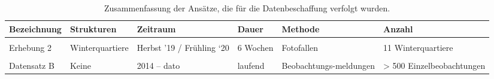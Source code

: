 \documentclass[
  oneside]{scrbook}
\begin{document}
\begin{table}

\caption{\label{tab:erhebungswochen}Zusammenfassung der Ansätze, die für die Datenbeschaffung verfolgt wurden.}
\centering
\begin{tabular}[t]{llp{20mm}lp{22mm}p{40mm}}
\toprule
Bezeichnung & Strukturen & Zeitraum & Dauer & Methode & Anzahl\\
\midrule
\cellcolor{gray!6}{Erhebung 1} & \cellcolor{gray!6}{Asthaufen} & \cellcolor{gray!6}{Herbst ’19 / Frühling ‘20} & \cellcolor{gray!6}{6 Wochen} & \cellcolor{gray!6}{Spurentunnel} & \cellcolor{gray!6}{39 Asthaufen}\\
Erhebung 2 & Winterquartiere & Herbst ’19 / Frühling ‘20 & 6 Wochen & Fotofallen & 11 Winterquartiere\\
\cellcolor{gray!6}{Datensatz A} & \cellcolor{gray!6}{Asthaufen} & \cellcolor{gray!6}{2014 - 2019} & \cellcolor{gray!6}{Variabel} & \cellcolor{gray!6}{Spurentunnel / Fotofallen} & \cellcolor{gray!6}{32 Asthaufen}\\
Datensatz B & Keine & 2014 – dato & laufend & Beobachtungs-meldungen & > 500 Einzelbeobachtungen\\
\bottomrule
\end{tabular}
\end{table}
\end{document}
